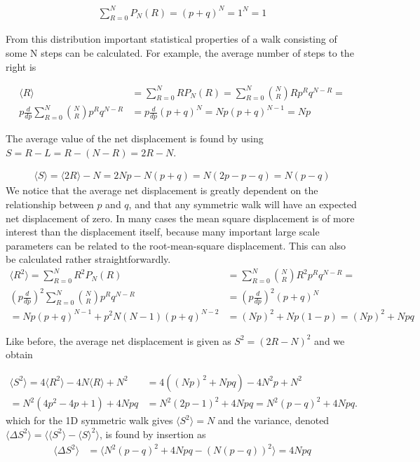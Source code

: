 \begin{align*}
 \sum\limits_{R=0}^N P_N(R) = (p+q)^N = 1^N = 1
\end{align*}

From this distribution important statistical properties of a walk consisting of some N steps can be calculated.
For example, the average number of steps to the right is

\begin{align*}
 \langle R\rangle &=  \sum\limits_{R=0}^N RP_N(R) =  \sum\limits_{R=0}^N {N\choose R}Rp^Rq^{N-R} = \\
 p\frac{d}{dp} \sum\limits_{R=0}^N {N\choose R}p^Rq^{N-R} &= p\frac{d}{dp}(p+q)^N = Np(p+q)^{N-1} = Np
\end{align*}

The average value of the net displacement is found by using $S = R-L = R-(N-R) = 2R-N$.

\begin{align*}
 \langle S\rangle = \langle2R\rangle -N = 2Np-N(p+q) = N(2p-p-q) = N(p-q)
\end{align*}
We notice that the average net displacement is greatly dependent on the relationship between $p$ and $q$, and that any symmetric walk will have an expected net displacement of zero. 
In many cases the mean square displacement is of more interest than the displacement itself, because many important large scale parameters can be related to the root-mean-square displacement. 
This can also be calculated rather straightforwardly. 
\begin{align*}
  \langle R^2\rangle =  \sum\limits_{R=0}^N R^2P_N(R) &=  \sum\limits_{R=0}^N {N\choose R}R^2p^Rq^{N-R} = \\
 \left(p\frac{d}{dp}\right)^2 \sum\limits_{R=0}^N {N\choose R}p^Rq^{N-R} &= \left(p\frac{d}{dp}\right)^2(p+q)^N \\
 = Np(p+q)^{N-1} +p^2N(N-1)(p+q)^{N-2} &= (Np)^2 +Np(1-p) = (Np)^2 +Npq
\end{align*}

Like before, the average net displacement is given as $S^2 = (2R-N)^2$ and we obtain

\begin{align*}
 \langle S^2\rangle = 4\langle R^2\rangle -4N\langle R\rangle + N^2 &= 4((Np)^2 +Npq) -4N^2p + N^2\\
 = N^2(4p^2 -4p +1) +4Npq &= N^2(2p-1)^2 +4Npq = N^2(p-q)^2 +4Npq.
\end{align*}
which for the 1D symmetric walk gives $\langle S^2\rangle =N$ and the variance, denoted $\langle\Delta S^2\rangle = \langle\langle S^2\rangle-\langle S\rangle^2\rangle$, is found by insertion as
\begin{align}
 \langle\Delta S^2\rangle &= \langle N^2(p-q)^2 +4Npq - ( N(p-q))^2\rangle= 4Npq 
\end{align}

